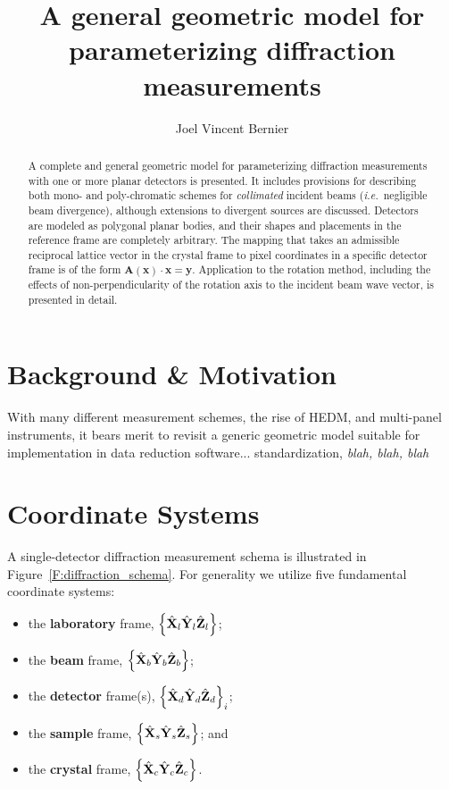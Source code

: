 \documentclass[12pt,letterpaper,final]{amsart}
\author{Joel Vincent Bernier}
\title{A general geometric model for parameterizing diffraction measurements}
\newcommand{\mbm}[1]{\ensuremath{\mbox{\boldmath$#1$}}}
\newcommand{\Xl}{\ensuremath{\hat{\mbm{\mathrm{X}}}_l}}
\newcommand{\Yl}{\ensuremath{\hat{\mbm{\mathrm{Y}}}_l}}
\newcommand{\Zl}{\ensuremath{\hat{\mbm{\mathrm{Z}}}_l}}
\newcommand{\labframe}{\ensuremath{\left\{\Xl\Yl\Zl\right\}}}
\newcommand{\Xb}{\ensuremath{\hat{\mbm{\mathrm{X}}}_b}}
\newcommand{\Yb}{\ensuremath{\hat{\mbm{\mathrm{Y}}}_b}}
\newcommand{\Zb}{\ensuremath{\hat{\mbm{\mathrm{Z}}}_b}}
\newcommand{\beamframe}{\ensuremath{\left\{\Xb\Yb\Zb\right\}}}
\newcommand{\Xd}{\ensuremath{\hat{\mbm{\mathrm{X}}}_d}}
\newcommand{\Yd}{\ensuremath{\hat{\mbm{\mathrm{Y}}}_d}}
\newcommand{\Zd}{\ensuremath{\hat{\mbm{\mathrm{Z}}}_d}}
\newcommand{\detframe}{\ensuremath{\left\{\Xd\Yd\Zd\right\}}}
\newcommand{\Xs}{\ensuremath{\hat{\mbm{\mathrm{X}}}_s}}
\newcommand{\Ys}{\ensuremath{\hat{\mbm{\mathrm{Y}}}_s}}
\newcommand{\Zs}{\ensuremath{\hat{\mbm{\mathrm{Z}}}_s}}
\newcommand{\sampframe}{\ensuremath{\left\{\Xs\Ys\Zs\right\}}}
\newcommand{\Xc}{\ensuremath{\hat{\mbm{\mathrm{X}}}_c}}
\newcommand{\Yc}{\ensuremath{\hat{\mbm{\mathrm{Y}}}_c}}
\newcommand{\Zc}{\ensuremath{\hat{\mbm{\mathrm{Z}}}_c}}
\newcommand{\crysframe}{\ensuremath{\left\{\Xc\Yc\Zc\right\}}}
\newcommand{\figref}[1]{Figure~\ref{#1}}
\newcommand{\ie}{{\em i.e.}}
\begin{document}
\maketitle
\begin{abstract}
A complete and general geometric model for parameterizing diffraction
measurements with one or more planar detectors is presented.  It includes provisions for describing both mono- and poly-chromatic schemes for {\em collimated} incident beams (\ie\ negligible beam divergence), although extensions to divergent sources are discussed.  Detectors are modeled as polygonal planar bodies, and their shapes and placements in the reference frame are completely arbitrary.  The mapping that takes an admissible reciprocal lattice vector in the crystal frame to pixel coordinates in a specific detector frame is of the form $\mathbf{A}(\mathbf{x})\cdot\mathbf{x} =
\mathbf{y}$.  Application to the rotation method, including the effects of non-perpendicularity of the rotation axis to the incident beam wave vector, is presented in detail.
\end{abstract}

\newpage

\section{Background \& Motivation}

With many different measurement schemes, the rise of HEDM, and multi-panel instruments, it bears merit to revisit a generic geometric model suitable for implementation in data reduction software... standardization, {\em blah, blah, blah}

\section{Coordinate Systems}

A single-detector diffraction measurement schema is illustrated in
\figref{F:diffraction_schema}.  For generality we utilize five
fundamental coordinate systems:
\begin{itemize}
  \item the {\bf laboratory} frame, \labframe;
  \item the {\bf beam} frame, \beamframe;
  \item the {\bf detector} frame(s), $\detframe_i$;
  \item the {\bf sample} frame, \sampframe; and
  \item the {\bf crystal} frame, \crysframe.
\end{itemize}
\end{document}
